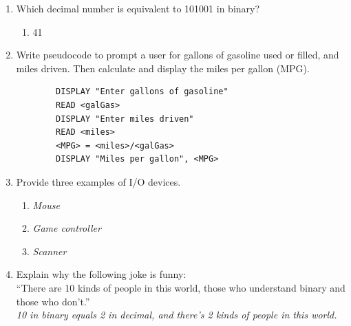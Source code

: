 \documentclass[letter,11pt]{article}
\newcommand*\tick{\item[\Checkmark]}
\begin{document}
\begin{enumerate}
    \item Which decimal number is equivalent to 101001 in binary?
    \begin{enumerate}
        \tick 41
    \end{enumerate}
    
    \item Write pseudocode to prompt a user for gallons of gasoline used or filled, and miles driven. Then calculate and display the miles per gallon (MPG).
    \begin{verbatim}
        DISPLAY "Enter gallons of gasoline"
        READ <galGas>
        DISPLAY "Enter miles driven"
        READ <miles>
        <MPG> = <miles>/<galGas>
        DISPLAY "Miles per gallon", <MPG>\end{verbatim}
    
    \item Provide three examples of I/O devices.
    \begin{enumerate}
        \item \color{red}\textit{Mouse} \color{black}{}
        \item \color{red}\textit{Game controller} \color{black}{}
        \item \color{red}\textit{Scanner} \color{black}{}
    \end{enumerate}
    
    \item Explain why the following joke is funny: \\
    ``There are 10 kinds of people in this world, those who understand binary and those who don't.'' \\
    \textit{10 in binary equals 2 in decimal, and there's 2 kinds of people in this world.}
\end{enumerate}
\end{document}
